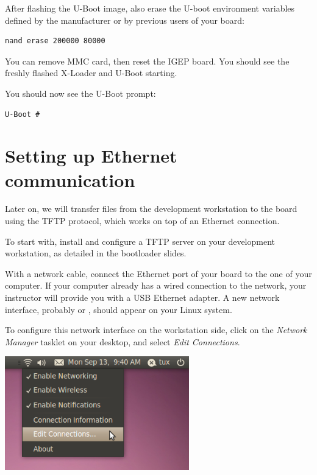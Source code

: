After flashing the U-Boot image, also erase the U-boot environment
variables defined by the manufacturer or by previous users of your
board:

\begin{verbatim}
nand erase 200000 80000
\end{verbatim}

You can remove MMC card, then reset the IGEP board. You should see the
freshly flashed X-Loader and U-Boot starting.

You should now see the U-Boot prompt:

\begin{verbatim}
U-Boot #
\end{verbatim}

\section{Setting up Ethernet communication}

Later on, we will transfer files from the development workstation to
the board using the TFTP protocol, which works on top of an Ethernet
connection.

To start with, install and configure a TFTP server on your development
workstation, as detailed in the bootloader slides.

With a network cable, connect the Ethernet port of your board to the
one of your computer. If your computer already has a wired connection
to the network, your instructor will provide you with a USB Ethernet
adapter. A new network interface, probably  or ,
should appear on your Linux system.

To configure this network interface on the workstation side, click on
the {\em Network Manager} tasklet on your desktop, and select {\em
  Edit Connections}.

\begin{center}
\includegraphics[width=8cm]{labs/sysdev-u-boot/network-config-1.png}
\end{center}

